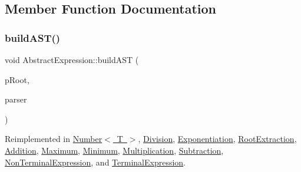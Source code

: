 \subsection{Member Function Documentation}
\mbox{\label{class_abstract_expression_a22801ba2c981103d20c8af71625a0b39}} 
\subsubsection{\texorpdfstring{buildAST()}{buildAST()}}
{\footnotesize\ttfamily void Abstract\+Expression\+::build\+A\+ST (\begin{DoxyParamCaption}\item[{std\+::unique\+\_\+ptr$<$ \mbox{\hyperlink{class_abstract_expression}{Abstract\+Expression}} $>$ \&}]{p\+Root,  }\item[{\mbox{\hyperlink{class_parser}{Parser}} \&}]{parser }\end{DoxyParamCaption})\hspace{0.3cm}{\ttfamily [virtual]}}



Reimplemented in \mbox{\hyperlink{class_number_af80f6bc48cbe13fb075447a0b8eca5f9}{Number$<$ T $>$}}, \mbox{\hyperlink{class_division_a217df7aed2f8edd71bce9a196243fc81}{Division}}, \mbox{\hyperlink{class_exponentiation_a7c600d4b547358c563edfc76ae8ac8a6}{Exponentiation}}, \mbox{\hyperlink{class_root_extraction_a2c50c1676599c87fe480ae19cd701f1d}{Root\+Extraction}}, \mbox{\hyperlink{class_addition_a5cd97a6e56814cfe24a1211aeaab907f}{Addition}}, \mbox{\hyperlink{class_maximum_a55e8a52bc27e2cf0e1d99ca246ff7189}{Maximum}}, \mbox{\hyperlink{class_minimum_abec83657924b745c348bee1ef300e580}{Minimum}}, \mbox{\hyperlink{class_multiplication_a0bf6680544c5d519ae23597696938a2a}{Multiplication}}, \mbox{\hyperlink{class_subtraction_a3473b659f19e10c5898c44ef964a1369}{Subtraction}}, \mbox{\hyperlink{class_non_terminal_expression_aa65153b69523e01d86893f6d7b7fc480}{Non\+Terminal\+Expression}}, and \mbox{\hyperlink{class_terminal_expression_a24eb92076324c9c57539b68015d42baa}{Terminal\+Expression}}.

\mbox{\label{class_abstract_expression_a1c9871ee669668c2eb9f1f1a7d6f5d32}} 
